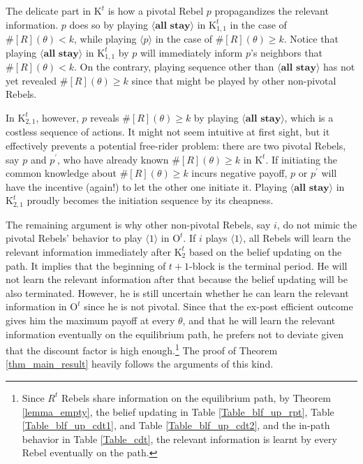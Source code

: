 \documentclass[12pt,letter]{article}
\newcommand{\Kappa}{\mathrm{K}}
\newcommand{\Omicron}{\mathrm{O}}
\theoremstyle{definition}
\theoremstyle{remark}
\theoremstyle{claim}
\begin{document}
\clearpage

The delicate part in $\Kappa^t$ is how a pivotal Rebel $p$ propagandizes the relevant information. $p$ does so by playing $\langle \textbf{all stay} \rangle$ in $\Kappa^{t}_{1,1}$ in the case of $\#[R](\theta)< k$, while playing $\langle p \rangle$ in the case of $\#[R](\theta)\geq k$. Notice that playing $\langle \textbf{all stay} \rangle$ in $\Kappa^{t}_{1,1}$ by $p$ will immediately inform $p$'s neighbors that $\#[R](\theta)< k$. On the contrary, playing sequence other than $\langle \textbf{all stay} \rangle$ has not yet revealed $\#[R](\theta)\geq k$ since that might be played by other non-pivotal Rebels. 

In $\Kappa^{t}_{2,1}$, however, $p$ reveals $\#[R](\theta)\geq k$ by playing $\langle \textbf{all stay} \rangle$, which is a costless sequence of actions. It might not seem intuitive at first sight, but it effectively prevents a potential free-rider problem: there are two pivotal Rebels, say $p$ and $p^{'}$, who have already known $\#[R](\theta)\geq k$ in $\Kappa^t$. If initiating the common knowledge about $\#[R](\theta)\geq k$ incurs negative payoff, $p$ or $p^{'}$ will have the incentive (again!) to let the other one initiate it. Playing $\langle \textbf{all stay} \rangle$ in $\Kappa^t_{2,1}$ proudly becomes the initiation sequence by its cheapness.

The remaining argument is why other non-pivotal Rebels, say $i$, do not mimic the pivotal Rebels' behavior to play $\langle 1 \rangle$ in $\Omicron^t$. If $i$ plays $\langle 1 \rangle$, all Rebels will learn the relevant information immediately after $\Kappa^t_2$ based on the belief updating on the path. It implies that the beginning of $t+1$-block is the terminal period. He will not learn the relevant information after that because the belief updating will be also terminated. However, he is still uncertain whether he can learn the relevant information in $\Omicron^t$ since he is not pivotal. Since that the ex-post efficient outcome gives him the maximum payoff at every $\theta$, and that he will learn the relevant information eventually on the equilibrium path, he prefers not to deviate given that the discount factor is high enough.\footnote{Since $R^t$ Rebels share information on the equilibrium path, by Theorem \ref{lemma_empty}, the belief updating in Table \ref{Table_blf_up_rpt}, Table \ref{Table_blf_up_cdt1}, and Table \ref{Table_blf_up_cdt2}, and the in-path behavior in Table \ref{Table_cdt}, the relevant information is learnt by every Rebel eventually on the path.} 
The proof of Theorem \ref{thm_main_result} heavily follows the arguments of this kind.
\end{document}
